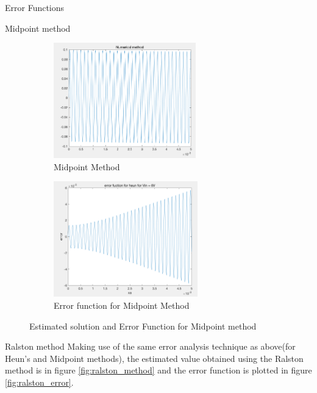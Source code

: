\documentclass[10pt,a4paper]{article}
\begin{document}
\begin{subsection}{Error Functions}
\begin{subsection}{Midpoint method}
\begin{figure}[h]
\begin{subfigure}{.5\textwidth}
  \includegraphics[width=.9\linewidth,height = 5cm
  ]{midpoint_error_numerical_method}
  \caption[right]{Midpoint Method}
  \label{fig:midpoint_method}
\end{subfigure}
\begin{subfigure}{.5\textwidth}
  \includegraphics[width=.9\linewidth,height = 5cm]{heun_error}
  \caption{Error function for Midpoint Method}
  \label{fig:midpoint_error}
\end{subfigure}
\caption{Estimated solution and Error Function for Midpoint method}
\label{fig:Method_Error_sub}
\end{figure}


\end{subsection}

\begin{subsection}{Ralston method}
Making use of the same error analysis technique as above(for Heun's and Midpoint methods), the estimated value obtained using the Ralston method is in figure \ref{fig:ralston_method} and the error function is plotted in figure \ref{fig:ralston_error}.


\end{subsection}
\end{subsection}
\end{document}
